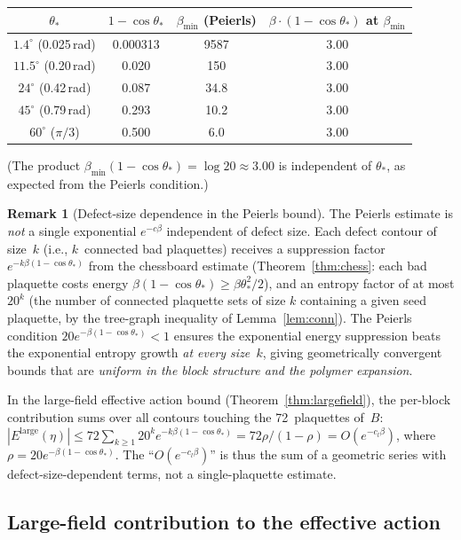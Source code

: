 \documentclass[11pt]{article}
\theoremstyle{definition}
\newtheorem{remark}[theorem]{Remark}
\begin{document}
\begin{center}
\begin{tabular}{cccc}
\toprule
$\theta_*$ & $1-\cos\theta_*$ & $\beta_{\min}$ (Peierls) &
$\beta\cdot(1-\cos\theta_*)$ at $\beta_{\min}$\\
\midrule
$1.4^\circ$ (0.025\,rad) & 0.000313 & 9587 & 3.00\\
$11.5^\circ$ (0.20\,rad) & 0.020 & 150 & 3.00\\
$24^\circ$ (0.42\,rad) & 0.087 & 34.8 & 3.00\\
$45^\circ$ (0.79\,rad) & 0.293 & 10.2 & 3.00\\
$60^\circ$ ($\pi/3$) & 0.500 & 6.0 & 3.00\\
\bottomrule
\end{tabular}
\end{center}

\noindent (The product $\beta_{\min}(1-\cos\theta_*)=\log 20\approx 3.00$
is independent of $\theta_*$, as expected from the Peierls condition.)

\begin{remark}[Defect-size dependence in the Peierls bound]%
\label{rem:peierls-size}
The Peierls estimate is \emph{not} a single exponential $e^{-c\beta}$
independent of defect size.  Each defect contour of size~$k$ (i.e.,
$k$~connected bad plaquettes) receives a suppression factor
$e^{-k\beta(1-\cos\theta_*)}$ from the chessboard estimate
(Theorem~\ref{thm:chess}: each bad plaquette costs energy
$\beta(1-\cos\theta_*)\ge\beta\theta_*^2/2$), and an entropy factor
of at most $20^k$ (the number of connected plaquette sets of size $k$
containing a given seed plaquette, by the tree-graph inequality of
Lemma~\ref{lem:conn}).  The Peierls condition
$20e^{-\beta(1-\cos\theta_*)}<1$ ensures the exponential energy
suppression beats the exponential entropy growth \emph{at every
size~$k$}, giving geometrically convergent bounds that are
\emph{uniform in the block structure and the polymer expansion}.

In the large-field effective action bound
(Theorem~\ref{thm:largefield}), the per-block contribution sums
over all contours touching the 72~plaquettes of~$B$:
$|E^{\mathrm{large}}(\eta)|\le 72\sum_{k\ge 1}20^k
e^{-k\beta(1-\cos\theta_*)}
=72\rho/(1-\rho)=O(e^{-c_l\beta})$,
where $\rho=20e^{-\beta(1-\cos\theta_*)}$.
The ``$O(e^{-c_l\beta})$'' is thus the sum of a geometric series
with defect-size-dependent terms, not a single-plaquette estimate.
\end{remark}

\subsection{Large-field contribution to the effective action}
\label{subsec:LFeff}
\end{document}
